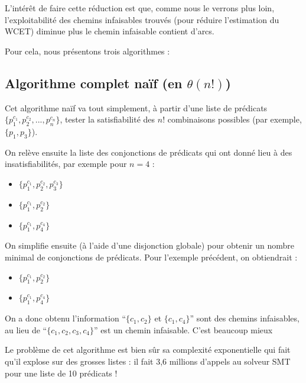 \documentclass[french]{article}
\newcommand\ccc[1]{\color{red}{#1}\color{black}} %
\begin{document}
  L'intérêt de faire cette réduction est que, comme nous le verrons plus loin, %
  l'exploitabilité des chemins infaisables trouvés (pour réduire l'estimation du WCET) diminue plus le chemin infaisable contient d'arcs.

  Pour cela, nous présentons trois algorithmes :

  \subsection{Algorithme complet naïf (en $\theta(n!)$)}
  Cet algorithme naïf va tout simplement, à partir d'une liste de prédicats $\{p_1^{c_1}, p_2^{c_2}, ..., p_n^{c_n}\}$, tester la satisfiabilité des $n!$ combinaisons possibles (par exemple, $\{p_1, p_3\}$).

  On relève ensuite la liste des conjonctions de prédicats qui ont donné lieu à des insatisfiabilités, par exemple pour $n = 4$ :

  \begin{itemize}
    \item $\{p_1^{c_1}, p_2^{c_2}, p_3^{c_3}\}$
    \item $\{p_1^{c_1}, p_2^{c_2}\}$
    \item $\{p_1^{c_1}, p_4^{c_4}\}$
  \end{itemize}

  On simplifie ensuite (à l'aide d'une disjonction globale) pour obtenir un nombre minimal de conjonctions de prédicats. Pour l'exemple précédent, on obtiendrait :

  \begin{itemize}
    \item $\{p_1^{c_1}, p_2^{c_2}\}$
    \item $\{p_1^{c_1}, p_4^{c_4}\}$
  \end{itemize}

  On a donc obtenu l'information ``$\{c_1, c_2\}$ et $\{c_1, c_4\}$'' sont des chemins infaisables, au lieu de ``$\{c_1, c_2, c_3, c_4\}$'' est un chemin infaisable. C'est beaucoup mieux \ccc{: on exclut plus de chemins (3 en l'occurence).}

  Le problème de cet algorithme est bien sûr sa complexité exponentielle qui fait qu'il explose sur des grosses listes : il fait 3,6 millions d'appels au solveur SMT pour une liste de 10 prédicats !
\end{document}

